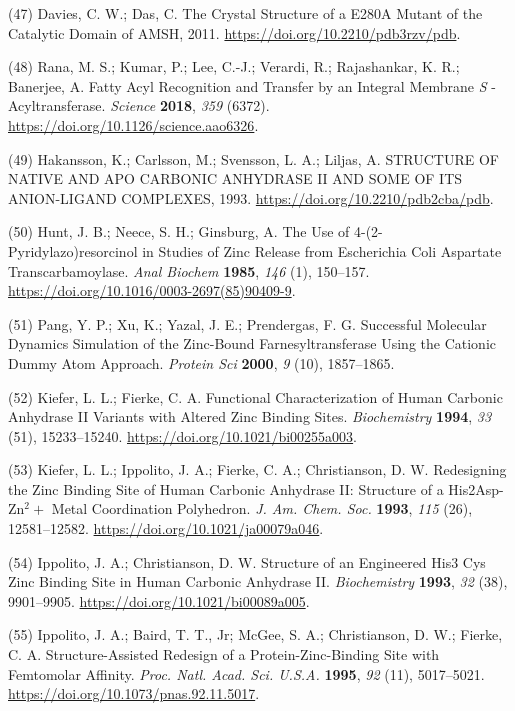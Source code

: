 \documentclass[  ASAPversion,
  ,
  9pt]{elife}
\newenvironment{cslreferences}%
  {}%
  {\par}
\begin{document}
\begin{cslreferences}
\leavevmode\hypertarget{ref-wW700ShK}{}%
(47) Davies, C. W.; Das, C. The Crystal Structure of a E280A Mutant of the Catalytic Domain of AMSH, 2011. \url{https://doi.org/10.2210/pdb3rzv/pdb}.

\leavevmode\hypertarget{ref-RFwEiPTW}{}%
(48) Rana, M. S.; Kumar, P.; Lee, C.-J.; Verardi, R.; Rajashankar, K. R.; Banerjee, A. Fatty Acyl Recognition and Transfer by an Integral Membrane \emph{S} -Acyltransferase. \emph{Science} \textbf{2018}, \emph{359} (6372). \url{https://doi.org/10.1126/science.aao6326}.

\leavevmode\hypertarget{ref-jyFnBdWm}{}%
(49) Hakansson, K.; Carlsson, M.; Svensson, L. A.; Liljas, A. STRUCTURE OF NATIVE AND APO CARBONIC ANHYDRASE II AND SOME OF ITS ANION-LIGAND COMPLEXES, 1993. \url{https://doi.org/10.2210/pdb2cba/pdb}.

\leavevmode\hypertarget{ref-13XuOF3Jj}{}%
(50) Hunt, J. B.; Neece, S. H.; Ginsburg, A. The Use of 4-(2-Pyridylazo)resorcinol in Studies of Zinc Release from Escherichia Coli Aspartate Transcarbamoylase. \emph{Anal Biochem} \textbf{1985}, \emph{146} (1), 150--157. \url{https://doi.org/10.1016/0003-2697(85)90409-9}.

\leavevmode\hypertarget{ref-pchdLF0k}{}%
(51) Pang, Y. P.; Xu, K.; Yazal, J. E.; Prendergas, F. G. Successful Molecular Dynamics Simulation of the Zinc-Bound Farnesyltransferase Using the Cationic Dummy Atom Approach. \emph{Protein Sci} \textbf{2000}, \emph{9} (10), 1857--1865.

\leavevmode\hypertarget{ref-D3VQQdjb}{}%
(52) Kiefer, L. L.; Fierke, C. A. Functional Characterization of Human Carbonic Anhydrase II Variants with Altered Zinc Binding Sites. \emph{Biochemistry} \textbf{1994}, \emph{33} (51), 15233--15240. \url{https://doi.org/10.1021/bi00255a003}.

\leavevmode\hypertarget{ref-w3tzhp92}{}%
(53) Kiefer, L. L.; Ippolito, J. A.; Fierke, C. A.; Christianson, D. W. Redesigning the Zinc Binding Site of Human Carbonic Anhydrase II: Structure of a His2Asp-Zn$^2+$ Metal Coordination Polyhedron. \emph{J. Am. Chem. Soc.} \textbf{1993}, \emph{115} (26), 12581--12582. \url{https://doi.org/10.1021/ja00079a046}.

\leavevmode\hypertarget{ref-iu33cNMg}{}%
(54) Ippolito, J. A.; Christianson, D. W. Structure of an Engineered His3 Cys Zinc Binding Site in Human Carbonic Anhydrase II. \emph{Biochemistry} \textbf{1993}, \emph{32} (38), 9901--9905. \url{https://doi.org/10.1021/bi00089a005}.

\leavevmode\hypertarget{ref-148Si7kTL}{}%
(55) Ippolito, J. A.; Baird, T. T., Jr; McGee, S. A.; Christianson, D. W.; Fierke, C. A. Structure-Assisted Redesign of a Protein-Zinc-Binding Site with Femtomolar Affinity. \emph{Proc. Natl. Acad. Sci. U.S.A.} \textbf{1995}, \emph{92} (11), 5017--5021. \url{https://doi.org/10.1073/pnas.92.11.5017}.


\end{cslreferences}
\end{document}
